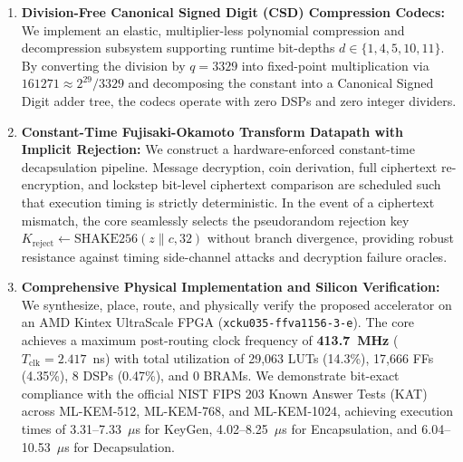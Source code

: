 \begin{enumerate}
    \item \textbf{Division-Free Canonical Signed Digit (CSD) Compression Codecs:}
    We implement an elastic, multiplier-less polynomial compression and decompression subsystem supporting runtime bit-depths $d \in \{1, 4, 5, 10, 11\}$. By converting the division by $q = 3329$ into fixed-point multiplication via $161271 \approx 2^{29}/3329$ and decomposing the constant into a Canonical Signed Digit adder tree, the codecs operate with zero DSPs and zero integer dividers.

    \item \textbf{Constant-Time Fujisaki-Okamoto Transform Datapath with Implicit Rejection:}
    We construct a hardware-enforced constant-time decapsulation pipeline. Message decryption, coin derivation, full ciphertext re-encryption, and lockstep bit-level ciphertext comparison are scheduled such that execution timing is strictly deterministic. In the event of a ciphertext mismatch, the core seamlessly selects the pseudorandom rejection key $K_{\text{reject}} \leftarrow \text{SHAKE256}(z \parallel c, 32)$ without branch divergence, providing robust resistance against timing side-channel attacks and decryption failure oracles.

    \item \textbf{Comprehensive Physical Implementation and Silicon Verification:}
    We synthesize, place, route, and physically verify the proposed accelerator on an AMD Kintex UltraScale FPGA (\texttt{xcku035-ffva1156-3-e}). The core achieves a maximum post-routing clock frequency of \textbf{413.7~MHz} ($T_{\text{clk}} = 2.417$~ns) with total utilization of 29,063 LUTs (14.3\%), 17,666 FFs (4.35\%), 8 DSPs (0.47\%), and 0 BRAMs. We demonstrate bit-exact compliance with the official NIST FIPS 203 Known Answer Tests (KAT) across ML-KEM-512, ML-KEM-768, and ML-KEM-1024, achieving execution times of 3.31--7.33~$\mu$s for KeyGen, 4.02--8.25~$\mu$s for Encapsulation, and 6.04--10.53~$\mu$s for Decapsulation.
\end{enumerate}

